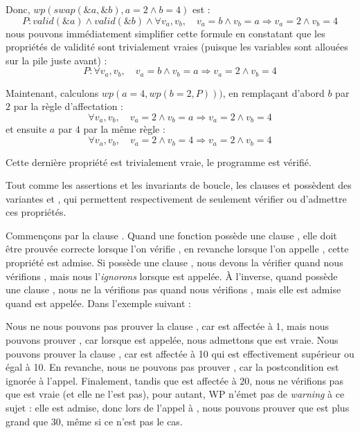 Donc, $wp(swap(\&a, \&b), a = 2 \wedge b = 4)$ est :
$$P: valid(\&a) \wedge valid(\&b) \wedge \forall v_a, v_b, \quad v_a = b \wedge v_b = a \Rightarrow v_a = 2 \wedge v_b = 4$$
nous pouvons immédiatement simplifier cette formule en constatant que les propriétés
de validité sont trivialement vraies (puisque les variables sont allouées sur la pile
juste avant) :
$$P: \forall v_a, v_b, \quad v_a = b \wedge v_b = a \Rightarrow v_a = 2 \wedge v_b = 4$$


Maintenant, calculons $wp(a = 4, wp(b = 2, P)))$, en remplaçant d'abord $b$
par $2$ par la règle d'affectation :
$$\forall v_a, v_b, \quad v_a = 2 \wedge v_b = a \Rightarrow v_a = 2 \wedge v_b = 4$$
et ensuite $a$ par $4$ par la même règle :
$$\forall v_a, v_b, \quad v_a = 2 \wedge v_b = 4 \Rightarrow v_a = 2 \wedge v_b = 4$$


Cette dernière propriété est trivialement vraie, le programme est vérifié.




Tout comme les assertions et les invariants de boucle, les clauses
 et  possèdent des variantes
 et , qui permettent respectivement de
seulement vérifier ou d'admettre ces propriétés.


Commençons par la clause . Quand une fonction 
possède une clause , elle doit être prouvée correcte lorsque l'on
vérifie , en revanche lorsque l'on appelle , cette
propriété est admise. Si  possède une clause
, nous devons la vérifier quand nous vérifions
, mais nous l'\textit{ignorons} lorsque  est appelée.
À l'inverse, quand  possède une clause , nous
ne la vérifions pas quand nous vérifions , mais elle est admise
quand  est appelée. Dans l'exemple suivant :



Nous ne nous pouvons pas prouver la clause , car
 est affectée à 1, mais nous pouvons prouver , car
lorsque  est appelée, nous admettons que  est vraie.
Nous pouvons prouver la clause , car  est
affectée à 10 qui est effectivement supérieur ou égal à 10. En revanche, nous ne
pouvons pas prouver , car la postcondition est ignorée à
l'appel. Finalement, tandis que  est affectée à 20, nous ne
vérifions pas que  est vraie (et elle ne l'est pas), pour autant,
WP n'émet pas de \textit{warning} à ce sujet : elle est admise, donc lors de
l'appel à , nous pouvons prouver que  est plus grand
que 30, même si ce n'est pas le cas.


